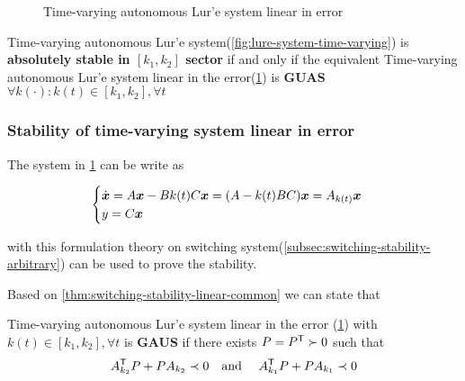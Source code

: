 \begin{figure}[htb]
    \centering
    \caption{Time-varying autonomous Lur'e system linear in error}
    \label{fig:lure-system-time-varying-linear}
\end{figure}

\begin{theorem}
    Time-varying autonomous Lur'e system(\cref{fig:lure-system-time-varying}) is \textbf{absolutely stable in $[k_1,k_2]$ sector}
    if and only if the equivalent Time-varying autonomous Lur'e system linear in the error(\cref{fig:lure-system-time-varying-linear})
    is \textbf{GUAS} $\forall k(\cdot) : k(t) \in [k_1,k_2], \forall t$
\end{theorem}

\subsubsection{Stability of time-varying system linear in error}

The system in \cref{fig:lure-system-time-varying-linear} can be write as

\[
    \begin{cases}
        \dot{\boldsymbol{x}} = A \boldsymbol{x} - B k(t) C\boldsymbol{x} = (A - k(t) B C) \boldsymbol{x} = A_{k(t)} \boldsymbol{x} \\
        y = C \boldsymbol{x}
    \end{cases}
\]

with this formulation theory on switching system(\cref{subsec:switching-stability-arbitrary}) can be used to prove the stability.

Based on \cref{thm:switching-stability-linear-common} we can state that

\begin{theorem}
    Time-varying autonomous Lur'e system linear in the error (\cref{fig:lure-system-time-varying-linear}) with $k(t) \in [k_1,k_2], \forall t$
    is \textbf{GAUS} if there exists  $P=P^{\mathsf{T}} \succ 0$ such that
    \[
        A_{k_2}^{\mathsf{T}} P + P A_{k_2} \prec 0 \text{\quad and \quad}
        A_{k_1}^{\mathsf{T}} P + P A_{k_1} \prec 0
    \]
\end{theorem}

